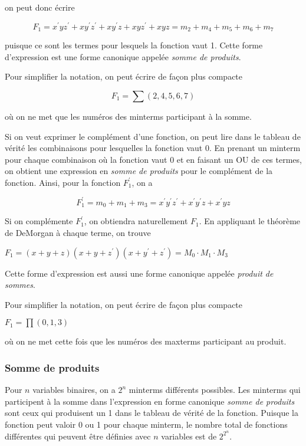 \documentclass[11pt]{article}
\begin{document}
on peut donc écrire

$$ F_1 = x^\prime y
z^\prime + x y^\prime z^\prime + x y^\prime z + x y z^\prime + x y z =
m_2 + m_4 + m_5 + m_6 + m_7 $$

puisque ce sont les termes pour lesquels la fonction vaut 1. Cette
forme d'expression est une forme canonique appelée \emph{somme de
produits}.

Pour simplifier la notation, on peut écrire de façon plus compacte  

$$F_1 = \sum (2, 4, 5, 6, 7)$$

où on ne met que les numéros des minterms participant à la somme.

Si on veut exprimer le complément d'une fonction, on peut lire dans le
tableau de vérité les combinaisons pour lesquelles la fonction
vaut 0. En prenant un minterm pour chaque combinaison où la fonction
vaut 0 et en faisant un OU de ces termes, on obtient une expression en
\emph{somme de produits} pour le complément de la fonction. Ainsi, pour la
fonction \(F_1^\prime\), on a

$$ F_1^\prime = m_0 + m_1 + m_3 = x^\prime y^\prime z^\prime +
x^\prime y^\prime z + x^\prime y z $$

Si on complémente \(F_1^\prime\), on obtiendra naturellement
\(F_1\). En appliquant le théorème de DeMorgan à chaque terme, on
trouve

\(F_1 = (x+ y+ z)(x + y + z^\prime)(x + y^\prime + z^\prime) = M_0
\cdot M_1 \cdot M_3\)

Cette forme d'expression est aussi une forme canonique appelée
\emph{produit de sommes}.

Pour simplifier la notation, on peut écrire de façon plus compacte  

\(F_1 = \prod (0,1,3)\)

où on ne met cette fois que les numéros des maxterms participant au
produit.

\subsubsection{Somme de produits}
\label{sec:orgd1e1be4}

Pour \(n\) variables binaires, on a \(2^n\) minterms différents
possibles. Les minterms qui participent à la somme dans l'expression
en forme canonique \emph{somme de produits} sont ceux qui produisent un 1
dans le tableau de vérité de la fonction. Puisque la fonction peut
valoir 0 ou 1 pour chaque minterm, le nombre total de fonctions
différentes qui peuvent être définies avec \(n\) variables est de
\(2^{2^n}\).
\end{document}
